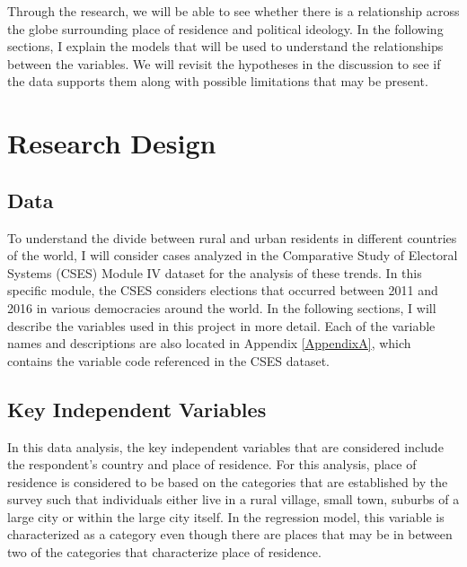 \documentclass[12pt, titlepage]{article}
\begin{document}
Through the research, we will be able to see whether there is a relationship across the globe surrounding place of residence and political ideology. In the following sections, I explain the models that will be used to understand the relationships between the variables. We will revisit the hypotheses in the discussion to see if the data supports them along with possible limitations that may be present.

\section{Research Design}

\subsection{Data}

To understand the divide between rural and urban residents in different countries of the world, I will consider cases analyzed in the Comparative Study of Electoral Systems (CSES) Module IV dataset for the analysis of these trends. In this specific module, the CSES considers elections that occurred between 2011 and 2016 in various democracies around the world. In the following sections, I will describe the variables used in this project in more detail. Each of the variable names and descriptions are also located in Appendix \ref{AppendixA}, which contains the variable code referenced in the CSES dataset.

\subsection{Key Independent Variables}

In this data analysis, the key independent variables that are considered include the respondent's country and place of residence. For this analysis, place of residence is considered to be based on the categories that are established by the survey such that individuals either live in a rural village, small town, suburbs of a large city or within the large city itself. In the regression model, this variable is characterized as a category even though there are places that may be in between two of the categories that characterize place of residence. 
\end{document}
